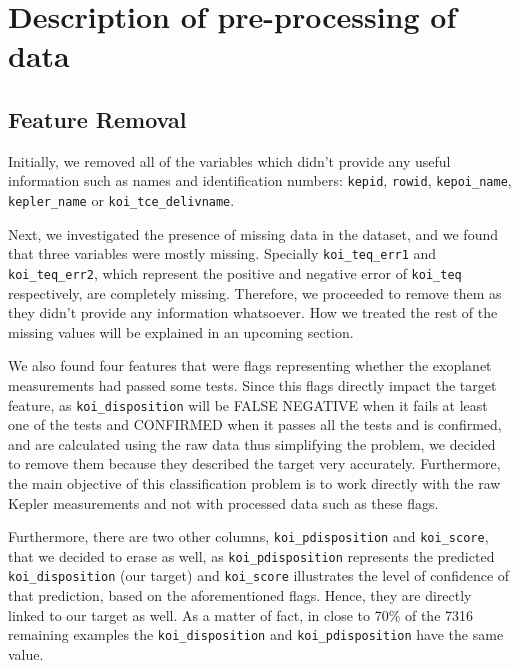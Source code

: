 
\section{Description of pre-processing of data}%
\label{sec:desc-prep}


\subsection{Feature Removal}

Initially, we removed all of the variables which didn't provide any useful information
such as names and identification numbers: \texttt{kepid}, \texttt{rowid}, 
\texttt{kepoi\_name}, \texttt{kepler\_name} or \texttt{koi\_tce\_delivname}.

Next, we investigated the presence of missing data in the dataset, and we found that three
variables were mostly missing. Specially \texttt{koi\_teq\_err1} and 
\texttt{koi\_teq\_err2}, which represent the positive and negative error 
of \texttt{koi\_teq} respectively, are completely missing. Therefore, we proceeded to 
remove them as they didn't provide any information whatsoever. How we treated the rest
of the missing values will be explained in an upcoming section.

We also found four features that were flags representing whether the exoplanet
measurements had passed some tests. Since this flags directly impact the
target feature, as \texttt{koi\_disposition} will be FALSE NEGATIVE when it fails
at least one of the tests and CONFIRMED when it passes all the tests and is confirmed,
and are calculated using the raw data thus simplifying the problem, we decided to 
remove them because they described the target very accurately. Furthermore, the
main objective of this classification problem is to work directly with the raw Kepler
measurements and not with processed data such as these flags.

Furthermore, there are two other columns, \texttt{koi\_pdisposition} and 
\texttt{koi\_score},
that we decided to erase as well, as 
\texttt{koi\_pdisposition} represents the predicted \texttt{koi\_disposition}
(our target) and \texttt{koi\_score} illustrates the level of confidence of
that prediction, based on the aforementioned flags. Hence, they are directly
linked to our target as well. As a matter of fact, in close to 70\% of the
7316 remaining examples the \texttt{koi\_disposition} and \texttt{koi\_pdisposition}
have the same value.

